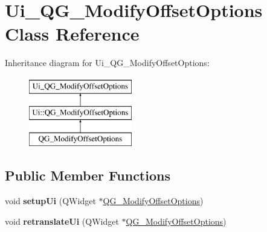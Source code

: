 \hypertarget{classUi__QG__ModifyOffsetOptions}{\section{Ui\-\_\-\-Q\-G\-\_\-\-Modify\-Offset\-Options Class Reference}
\label{classUi__QG__ModifyOffsetOptions}
}
Inheritance diagram for Ui\-\_\-\-Q\-G\-\_\-\-Modify\-Offset\-Options\-:\begin{figure}[H]
\begin{center}
\leavevmode
\includegraphics[height=3.000000cm]{classUi__QG__ModifyOffsetOptions}
\end{center}
\end{figure}
\subsection*{Public Member Functions}
\begin{DoxyCompactItemize}
\item 
\hypertarget{classUi__QG__ModifyOffsetOptions_acfebeffdf013ca05e8ed734f985a7db3}{void {\bfseries setup\-Ui} (Q\-Widget $\ast$\hyperlink{classQG__ModifyOffsetOptions}{Q\-G\-\_\-\-Modify\-Offset\-Options})}\label{classUi__QG__ModifyOffsetOptions_acfebeffdf013ca05e8ed734f985a7db3}

\item 
\hypertarget{classUi__QG__ModifyOffsetOptions_a1741b20b5efb628a208d9e8b39f99853}{void {\bfseries retranslate\-Ui} (Q\-Widget $\ast$\hyperlink{classQG__ModifyOffsetOptions}{Q\-G\-\_\-\-Modify\-Offset\-Options})}\label{classUi__QG__ModifyOffsetOptions_a1741b20b5efb628a208d9e8b39f99853}

\end{DoxyCompactItemize}
